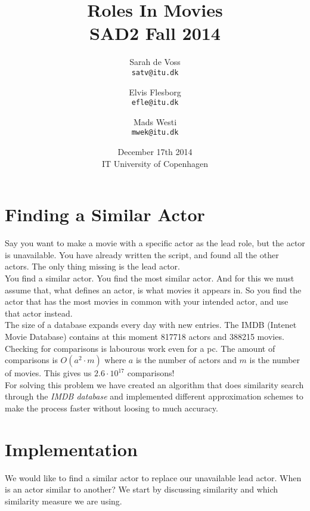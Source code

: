 \documentclass[a4paper,11pt]{article}
\begin{document}
\setlength{\parindent}{0cm}
\setlength{\unitlength}{1mm}
\date{December 17th 2014\\ IT University of Copenhagen}
\title{Roles In Movies\\SAD2 Fall 2014}

\author{Sarah de Voss\\
\texttt{satv@itu.dk}
\and Elvis Flesborg\\
\texttt{efle@itu.dk}
\and Mads Westi\\
\texttt{mwek@itu.dk}}
\clearpage\maketitle

\thispagestyle{empty}
\newpage
\tableofcontents
\thispagestyle{empty}
\newpage

\setcounter{page}{1}
\section{Finding a Similar Actor}

Say you want to make a movie with a specific actor as the lead role, but the actor is unavailable. You have already written the script, and found all the other actors. The only thing missing is the lead actor. \\

You find a similar actor. You find the most similar actor. And for this we must assume that, what defines an actor, is what movies it appears in. So you find the actor that has the most movies in common with your intended actor, and use that actor instead. \\

The size of a database expands every day with new entries. The IMDB (Intenet Movie Database) contains at this moment 817718 actors and 388215 movies. Checking for comparisons is labourous work even for a pc. The amount of comparisons is $O(a^2\cdot m)$ where $a$ is the number of actors and $m$ is the number of movies. This gives us $2.6\cdot 10^{17}$ comparisons!\\

For solving this problem we have created an algorithm that does similarity search through the \emph{IMDB database} and implemented different approximation schemes to make the process faster without loosing to much accuracy.


\section{Implementation}
We would like to find a similar actor to replace our unavailable lead actor. When is an actor similar to another? We start by discussing similarity and which similarity measure we are using.\\
\end{document}

